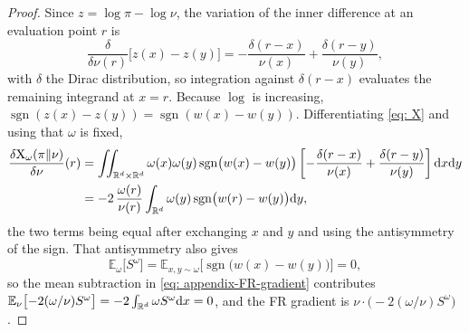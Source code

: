 \documentclass{article}
\begin{document}
\begin{proof}
Since $z = \log\pi-\log\nu$, the variation of the inner difference at an evaluation point $r$ is
\begin{equation*}
    \frac{\delta}{\delta\nu(r)}\bigl[z(x)-z(y)\bigr]
    = -\frac{\delta(r-x)}{\nu(x)} + \frac{\delta(r-y)}{\nu(y)},
\end{equation*}
with $\delta$ the Dirac distribution, so integration against $\delta(r-x)$ evaluates the remaining integrand at $x=r$. Because $\log$ is increasing, $\operatorname{sgn}(z(x)-z(y)) = \operatorname{sgn}(w(x)-w(y))$. Differentiating \eqref{eq: X} and using that $\omega$ is fixed,
\begin{align*}
    \frac{\delta \mathrm{X}_\omega(\pi\|\nu)}{\delta\nu}(r)
    &= \iint_{\mathbb R^d\times\mathbb R^d} \omega(x)\omega(y)\operatorname{sgn}\bigl(w(x)-w(y)\bigr)
       \left[-\frac{\delta(r-x)}{\nu(x)} + \frac{\delta(r-y)}{\nu(y)}\right] \mathrm{d} x \mathrm{d} y \\
    &= -2\,\frac{\omega(r)}{\nu(r)}\int_{\mathbb R^d} \omega(y)\operatorname{sgn}\bigl(w(r)-w(y)\bigr)\mathrm{d} y ,
\end{align*}
the two terms being equal after exchanging $x$ and $y$ and using the antisymmetry of the sign. That antisymmetry also gives
\begin{equation}
    \mathbb E_{\omega}\bigl[S^{\omega}\bigr] = \mathbb E_{x,y\sim\omega}\bigl[\operatorname{sgn}\bigl(w(x)-w(y)\bigr)\bigr] = 0 ,
    \label{eq: appendix-S-mean-zero}
\end{equation}
so the mean subtraction in \eqref{eq: appendix-FR-gradient} contributes $\mathbb E_\nu\bigl[-2(\omega/\nu)S^{\omega}\bigr] = -2\int_{\mathbb R^d}\omega S^{\omega}\mathrm{d} x = 0$, and the FR gradient is $\nu\cdot\bigl(-2(\omega/\nu)S^{\omega}\bigr)$.
\end{proof}
\end{document}

